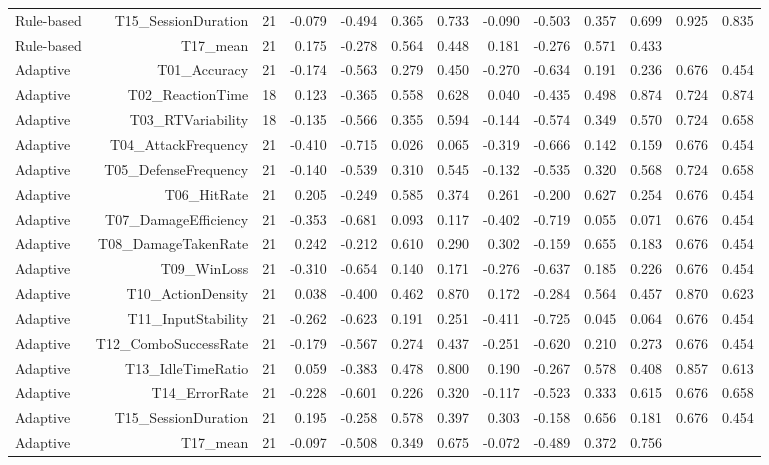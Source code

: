 \documentclass[10pt]{article}
\begin{document}
{\begin{longtable}{lrrrrrrrrrrrr}
Rule-based & T15\_SessionDuration & 21 & -0.079 & -0.494 & 0.365 & 0.733 & -0.090 & -0.503 & 0.357 & 0.699 & 0.925 & 0.835 \\
Rule-based & T17\_mean & 21 & 0.175 & -0.278 & 0.564 & 0.448 & 0.181 & -0.276 & 0.571 & 0.433 &  &  \\
Adaptive & T01\_Accuracy & 21 & -0.174 & -0.563 & 0.279 & 0.450 & -0.270 & -0.634 & 0.191 & 0.236 & 0.676 & 0.454 \\
Adaptive & T02\_ReactionTime & 18 & 0.123 & -0.365 & 0.558 & 0.628 & 0.040 & -0.435 & 0.498 & 0.874 & 0.724 & 0.874 \\
Adaptive & T03\_RTVariability & 18 & -0.135 & -0.566 & 0.355 & 0.594 & -0.144 & -0.574 & 0.349 & 0.570 & 0.724 & 0.658 \\
Adaptive & T04\_AttackFrequency & 21 & -0.410 & -0.715 & 0.026 & 0.065 & -0.319 & -0.666 & 0.142 & 0.159 & 0.676 & 0.454 \\
Adaptive & T05\_DefenseFrequency & 21 & -0.140 & -0.539 & 0.310 & 0.545 & -0.132 & -0.535 & 0.320 & 0.568 & 0.724 & 0.658 \\
Adaptive & T06\_HitRate & 21 & 0.205 & -0.249 & 0.585 & 0.374 & 0.261 & -0.200 & 0.627 & 0.254 & 0.676 & 0.454 \\
Adaptive & T07\_DamageEfficiency & 21 & -0.353 & -0.681 & 0.093 & 0.117 & -0.402 & -0.719 & 0.055 & 0.071 & 0.676 & 0.454 \\
Adaptive & T08\_DamageTakenRate & 21 & 0.242 & -0.212 & 0.610 & 0.290 & 0.302 & -0.159 & 0.655 & 0.183 & 0.676 & 0.454 \\
Adaptive & T09\_WinLoss & 21 & -0.310 & -0.654 & 0.140 & 0.171 & -0.276 & -0.637 & 0.185 & 0.226 & 0.676 & 0.454 \\
Adaptive & T10\_ActionDensity & 21 & 0.038 & -0.400 & 0.462 & 0.870 & 0.172 & -0.284 & 0.564 & 0.457 & 0.870 & 0.623 \\
Adaptive & T11\_InputStability & 21 & -0.262 & -0.623 & 0.191 & 0.251 & -0.411 & -0.725 & 0.045 & 0.064 & 0.676 & 0.454 \\
Adaptive & T12\_ComboSuccessRate & 21 & -0.179 & -0.567 & 0.274 & 0.437 & -0.251 & -0.620 & 0.210 & 0.273 & 0.676 & 0.454 \\
Adaptive & T13\_IdleTimeRatio & 21 & 0.059 & -0.383 & 0.478 & 0.800 & 0.190 & -0.267 & 0.578 & 0.408 & 0.857 & 0.613 \\
Adaptive & T14\_ErrorRate & 21 & -0.228 & -0.601 & 0.226 & 0.320 & -0.117 & -0.523 & 0.333 & 0.615 & 0.676 & 0.658 \\
Adaptive & T15\_SessionDuration & 21 & 0.195 & -0.258 & 0.578 & 0.397 & 0.303 & -0.158 & 0.656 & 0.181 & 0.676 & 0.454 \\
Adaptive & T17\_mean & 21 & -0.097 & -0.508 & 0.349 & 0.675 & -0.072 & -0.489 & 0.372 & 0.756 &  &  \\
\bottomrule
\end{longtable}}
\end{document}
